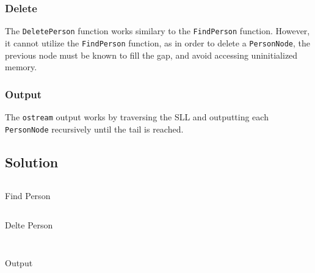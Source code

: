         \subsubsection*{Delete}
            The \texttt{DeletePerson} function works similary to the 
            \texttt{FindPerson} function. However, it cannot utilize the \texttt{FindPerson}
            function, as in order to delete a \texttt{PersonNode},
            the previous node must be known to fill the gap, 
            and avoid accessing uninitialized memory.

        \subsubsection*{Output}
            The \texttt{ostream} output works by traversing the SLL and outputting
            each \texttt{PersonNode} recursively until the tail is reached.

    \subsection*{Solution}
        \begin{listing}[H]
            \inputminted[firstline=44, lastline=51]{cpp}{../Tasks/03-FindDeleteOutput/AddressBookSLL.cpp}
            \caption{Find Person}
        \end{listing}

        \begin{listing}[H]
            \inputminted[firstline=53, lastline=81]{cpp}{../Tasks/03-FindDeleteOutput/AddressBookSLL.cpp}
            \caption{Delte Person}
        \end{listing}

        \begin{listing}[H]
            \inputminted[firstline=83, lastline=89]{cpp}{../Tasks/03-FindDeleteOutput/AddressBookSLL.cpp}
            \inputminted[firstline=42]{cpp}{../Tasks/03-FindDeleteOutput/PersonNode.cpp}
            \caption{Output}
        \end{listing}